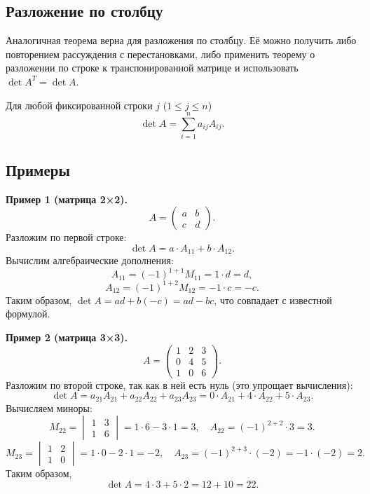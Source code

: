 \documentclass[a4paper,12pt]{article}
\theoremstyle{definition}
\theoremstyle{plain}
\theoremstyle{remark}
\begin{document}
	\subsection{Разложение по столбцу}
	
	Аналогичная теорема верна для разложения по столбцу. Её можно получить либо повторением рассуждения с перестановками, либо применить теорему о разложении по строке к транспонированной матрице и использовать \( \det A^T = \det A \).
	
	\begin{tcolorbox}[colback=green!5, colframe=green!50!black, title=Теорема (Разложение по j-му столбцу)]
		Для любой фиксированной строки \( j \) (\( 1 \leq j \leq n \))
		\[
		\det A = \sum_{i=1}^{n} a_{ij} A_{ij}.
		\]
	\end{tcolorbox}
	
	\subsection{Примеры}
	
	\textbf{Пример 1 (матрица 2×2).} 
	\[
	A = \begin{pmatrix} a & b \\ c & d \end{pmatrix}.
	\]
	Разложим по первой строке:
	\[
	\det A = a \cdot A_{11} + b \cdot A_{12}.
	\]
	Вычислим алгебраические дополнения:
	\[
	A_{11} = (-1)^{1+1} M_{11} = 1 \cdot d = d,
	\]
	\[
	A_{12} = (-1)^{1+2} M_{12} = -1 \cdot c = -c.
	\]
	Таким образом, \( \det A = a d + b (-c) = ad - bc \), что совпадает с известной формулой.
	
	\textbf{Пример 2 (матрица 3×3).}
	\[
	A = \begin{pmatrix}
		1 & 2 & 3 \\
		0 & 4 & 5 \\
		1 & 0 & 6
	\end{pmatrix}.
	\]
	Разложим по второй строке, так как в ней есть нуль (это упрощает вычисления):
	\[
	\det A = a_{21} A_{21} + a_{22} A_{22} + a_{23} A_{23} = 0 \cdot A_{21} + 4 \cdot A_{22} + 5 \cdot A_{23}.
	\]
	Вычисляем миноры:
	\[
	M_{22} = \begin{vmatrix} 1 & 3 \\ 1 & 6 \end{vmatrix} = 1\cdot6 - 3\cdot1 = 3,
	\quad A_{22} = (-1)^{2+2} \cdot 3 = 3.
	\]
	\[
	M_{23} = \begin{vmatrix} 1 & 2 \\ 1 & 0 \end{vmatrix} = 1\cdot0 - 2\cdot1 = -2,
	\quad A_{23} = (-1)^{2+3} \cdot (-2) = -1 \cdot (-2) = 2.
	\]
	Таким образом,
	\[
	\det A = 4 \cdot 3 + 5 \cdot 2 = 12 + 10 = 22.
	\]
	
\end{document}
